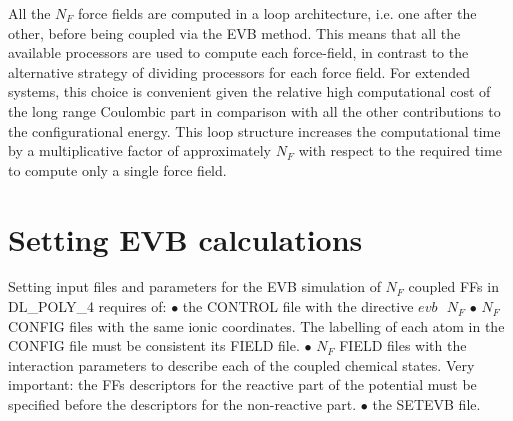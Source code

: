 All the $N_F$ force fields are computed in a loop architecture, i.e. one after the other, before being coupled via the EVB method. This means that all the available processors are used to compute each force-field, in contrast to the alternative strategy of dividing processors for each force field. For extended systems, this choice is convenient given the relative high computational cost of the long range Coulombic part in comparison with all the other contributions to the configurational energy. This loop structure increases the computational time by a multiplicative factor of approximately $N_F$ with respect to the required time to compute only a single force field. 

\section{Setting EVB calculations}\label{sec:evb-users}
Setting input files and parameters for the EVB simulation of $N_F$ coupled FFs in DL\_POLY\_4 requires of:\newline
$\bullet$ the CONTROL file with the directive $evb\,\,\,\, N_F$\newline 
$\bullet$ $N_F$ CONFIG files with the same ionic coordinates. The labelling of each atom in the CONFIG file must be consistent its FIELD file.\newline
$\bullet$ $N_F$ FIELD files with the interaction parameters to describe each of the coupled chemical states. Very important: the FFs descriptors for the reactive part of the potential must be specified before the descriptors for the non-reactive part. \newline
$\bullet$ the SETEVB file.\\

